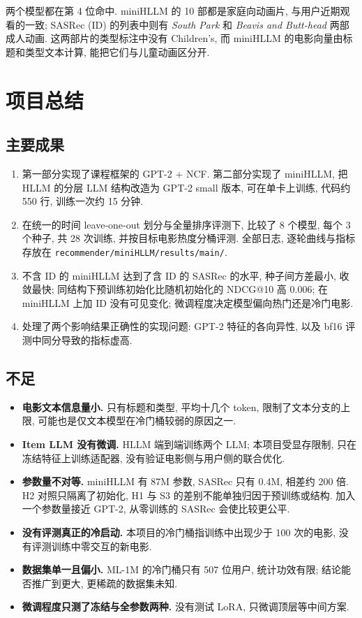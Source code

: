 \documentclass{article}
\begin{document}
两个模型都在第 4 位命中. miniHLLM 的 10 部都是家庭向动画片, 与用户近期观看的一致; SASRec (ID) 的列表中则有 \emph{South Park} 和 \emph{Beavis and Butt-head} 两部成人动画. 这两部片的类型标注中没有 Children's, 而 miniHLLM 的电影向量由标题和类型文本计算, 能把它们与儿童动画区分开.

\section{项目总结}

\subsection{主要成果}

\begin{enumerate}
  \item 第一部分实现了课程框架的 GPT-2 + NCF. 第二部分实现了 miniHLLM, 把 HLLM 的分层 LLM 结构改造为 GPT-2 small 版本, 可在单卡上训练, 代码约 550 行, 训练一次约 15 分钟.
  \item 在统一的时间 leave-one-out 划分与全量排序评测下, 比较了 8 个模型, 每个 3 个种子, 共 28 次训练, 并按目标电影热度分桶评测. 全部日志, 逐轮曲线与指标存放在 \texttt{recommender/miniHLLM/results/main/}.
  \item 不含 ID 的 miniHLLM 达到了含 ID 的 SASRec 的水平, 种子间方差最小, 收敛最快; 同结构下预训练初始化比随机初始化的 NDCG@10 高 0.006; 在 miniHLLM 上加 ID 没有可见变化; 微调程度决定模型偏向热门还是冷门电影.
  \item 处理了两个影响结果正确性的实现问题: GPT-2 特征的各向异性, 以及 bf16 评测中同分导致的指标虚高.
\end{enumerate}

\subsection{不足}
\label{sec:limits}

\begin{itemize}
  \item \textbf{电影文本信息量小.} 只有标题和类型, 平均十几个 token, 限制了文本分支的上限, 可能也是仅文本模型在冷门桶较弱的原因之一.
  \item \textbf{Item LLM 没有微调.} HLLM 端到端训练两个 LLM; 本项目受显存限制, 只在冻结特征上训练适配器, 没有验证电影侧与用户侧的联合优化.
  \item \textbf{参数量不对等.} miniHLLM 有 87M 参数, SASRec 只有 0.4M, 相差约 200 倍. H2 对照只隔离了初始化, H1 与 S3 的差别不能单独归因于预训练或结构. 加入一个参数量接近 GPT-2, 从零训练的 SASRec 会使比较更公平.
  \item \textbf{没有评测真正的冷启动.} 本项目的冷门桶指训练中出现少于 100 次的电影, 没有评测训练中零交互的新电影.
  \item \textbf{数据集单一且偏小.} ML-1M 的冷门桶只有 507 位用户, 统计功效有限; 结论能否推广到更大, 更稀疏的数据集未知.
  \item \textbf{微调程度只测了冻结与全参数两种.} 没有测试 LoRA, 只微调顶层等中间方案.
\end{itemize}
\end{document}
